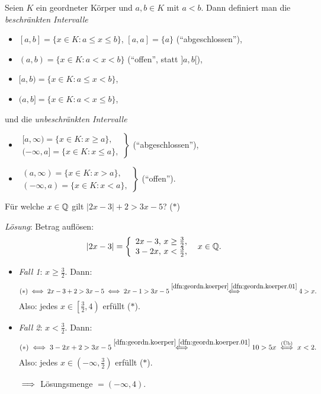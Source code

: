 \documentclass[12pt]{scrreprt}
\begin{document}
\begin{dfn}\label{dfn:abgeschl.Intervalle}
Seien $K$ ein geordneter Körper und $a, b \in K$ mit $a < b$. Dann definiert man die \emph{beschränkten Intervalle}

\begin{itemize}
\item[] $[a,b] = \{x\in K: a \leq x \leq b\}$, $[a,a] = \{a\}$ ("`abgeschlossen"'),

\item[] $(a,b) = \{x\in K: a < x < b\}$ ("`offen"', statt $]a,b[$),

\item[] $[a,b) = \{x\in K: a \leq x < b\}$,

\item[] $(a,b] = \{x\in K: a < x \leq b\}$,
\end{itemize}

und die \emph{unbeschränkten Intervalle}
\begin{itemize}
\item[] $\displaystyle\left.\begin{array}{l}[a,\infty) = \{x\in K: x\geq a\},\\(-\infty,a] = \{x\in K: x\leq a\},\end{array}\right\}$ ("`abgeschlossen"'),

\item[] $\displaystyle\left.\begin{array}{l}(a,\infty) = \{x\in K: x > a\},\\(-\infty,a) = \{x\in K: x < a\},\end{array}\right\}$ ("`offen"').
\end{itemize}
\end{dfn}

\begin{bsp*} Für welche $x\in\mathbb{Q}$ gilt $|2x-3|+2 > 3x-5$? ($\ast$)

\emph{Lösung}: Betrag auflösen:
\[|2x-3| = \left\{\begin{array}{r @{,\ } l @{,}}2x-3&x\geq\frac{3}{2}\\3-2x&x<\frac{3}{2}\end{array}\right.\quad\rat{x}.\]

\begin{itemize}
\item[]\emph{Fall 1}: $\displaystyle x \geq \frac{3}{2}$. Dann:
\[(\ast) \iff 2x - 3 + 2 > 3x - 5 \iff 2x - 1 > 3x - 5 \stackrel{\ref{dfn:geordn.koerper}~\ref{dfn:geordn.koerper.01}}{\iff} 4 > x.\]
Also: jedes $\displaystyle x\in \left[\frac{3}{2}, 4\right)$ erfüllt ($\ast$).

\item[]\emph{Fall 2}: $\displaystyle x < \frac{3}{2}$. Dann:
\[(\ast)\iff 3-2x+2 > 3x-5 \stackrel{\ref{dfn:geordn.koerper}~\ref{dfn:geordn.koerper.01}}{\iff} 10 > 5x \stackrel{\mathrm{(\ddot{U}b)}}{\iff} x < 2.\]
Also: jedes $\displaystyle x\in \left(-\infty,\frac{3}{2}\right)$ erfüllt ($\ast$).

$\implies$ Lösungsmenge $= (-\infty, 4)$.
\end{itemize}
\end{bsp*}
\end{document}
